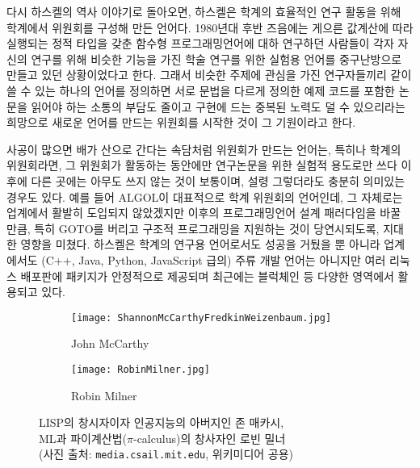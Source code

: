 다시 하스켈의 역사\cite{Hudak2007HistoryHaskell} 이야기로 돌아오면,
하스켈은 학계의 효율적인 연구 활동을 위해 학계에서 위원회를 구성해 만든 언어다.
1980년대 후반 즈음에는 게으른 값계산에 따라 실행되는 정적 타입을 갖춘
함수형 프로그래밍언어에 대하 연구하던 사람들이 각자 자신의 연구를 위해
비슷한 기능을 가진 학술 연구를 위한 실험용 언어를 중구난방으로 만들고
있던 상황이었다고 한다. 그래서 비슷한 주제에 관심을 가진 연구자들끼리
같이 쓸 수 있는 하나의 언어를 정의하면 서로 문법을 다르게 정의한 예제
코드를 포함한 논문을 읽어야 하는 소통의 부담도 줄이고 구현에 드는 중복된
노력도 덜 수 있으리라는 희망으로 새로운 언어를 만드는 위원회를 시작한 것이
그 기원이라고 한다.

사공이 많으면 배가 산으로 간다는 속담처럼 위원회가 만드는 언어는,
특히나 학계의 위원회라면, 그 위원회가 활동하는 동안에만 연구논문을
위한 실험적 용도로만 쓰다 이후에 다른 곳에는 아무도 쓰지 않는 것이 보통이며,
설령 그렇더라도 충분히 의미있는 경우도 있다. 예를 들어 ALGOL이 대표적으로
학계 위원회의 언어인데, 그 자체로는 업계에서 활발히 도입되지 않았겠지만
이후의 프로그래밍언어 설계 패러다임을 바꿀 만큼, 특히 GOTO를 버리고
구조적 프로그래밍을 지원하는 것이 당연시되도록, 지대한 영향을 미쳤다.
하스켈은 학계의 연구용 언어로서도 성공을 거뒀을 뿐 아니라 업계에서도
(C++, Java, Python, JavaScript 급의) 주류 개발 언어는 아니지만 여러
리눅스 배포판에 패키지가 안정적으로 제공되며 최근에는
블럭체인\cite{Seijas2020Marlowe} 등 다양한 영역에서 활용되고 있다.

\begin{figure}\centering
\begin{subfigure}{.3\textwidth}\centering
\texttt{[image: ShannonMcCarthyFredkinWeizenbaum.jpg]}
\caption{John McCarthy}
\end{subfigure}
\qquad\qquad
\begin{subfigure}{.3\textwidth}\centering
\texttt{[image: RobinMilner.jpg]}
\caption{Robin Milner}
\end{subfigure}
\caption{LISP의 창시자이자 인공지능의 아버지인 존 매카시,\\
         ML과 파이계산법($\pi$-calculus)의 창사자인 로빈 밀너\\
         {\footnotesize(사진 출처: \texttt{media.csail.mit.edu},
                        위키미디어 공용)}
	 \label{fig:McCarthyMilner} }
\end{figure}

